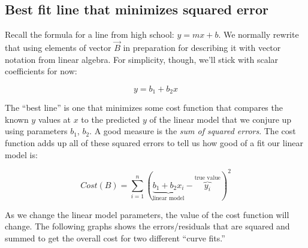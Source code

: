 \begin{fullwidth}
\subsection{Best fit line that minimizes squared error}

Recall the formula for a line from high school: $y = m x + b$.  We normally rewrite that using elements of vector $\vec{B}$ in preparation for describing it with vector notation from linear algebra. For simplicity,  though, we'll stick with scalar coefficients for now:

\[
y = b_1 + b_2 x
\]

The ``best line'' is one that minimizes some cost function that compares the known $y$ values at $x$ to the predicted $y$ of the linear model that we conjure up using parameters $b_1$, $b_2$. A good measure is the {\em sum of squared errors}. The cost function adds up all of these squared errors to tell us how good of a fit our linear model is:

\[
Cost(B) = \sum_{i=1}^{n}(\underbrace{b_1 + b_2 x_i}_\text{linear model} - \overbrace{y_i}^\text{true value})^2
\]

\noindent As we change the linear model parameters, the value of the cost function will change.  The following graphs shows the errors/residuals that are squared and summed to get the overall cost for two different ``curve fits.''


\end{fullwidth}
